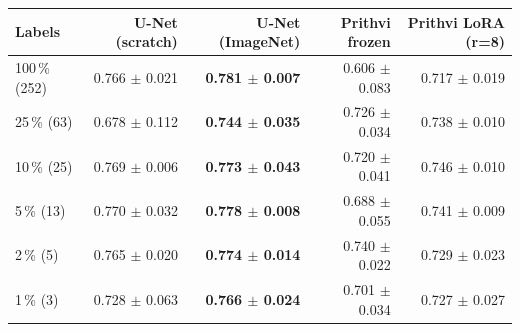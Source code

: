 \begin{tabular}{lrrrr}
\toprule
Labels & U-Net (scratch) & U-Net (ImageNet) & Prithvi frozen & Prithvi LoRA (r=8) \\
\midrule
100\,\% (252) & 0.766 $\pm$ 0.021 & \textbf{0.781 $\pm$ 0.007} & 0.606 $\pm$ 0.083 & 0.717 $\pm$ 0.019 \\
25\,\% (63) & 0.678 $\pm$ 0.112 & \textbf{0.744 $\pm$ 0.035} & 0.726 $\pm$ 0.034 & 0.738 $\pm$ 0.010 \\
10\,\% (25) & 0.769 $\pm$ 0.006 & \textbf{0.773 $\pm$ 0.043} & 0.720 $\pm$ 0.041 & 0.746 $\pm$ 0.010 \\
5\,\% (13) & 0.770 $\pm$ 0.032 & \textbf{0.778 $\pm$ 0.008} & 0.688 $\pm$ 0.055 & 0.741 $\pm$ 0.009 \\
2\,\% (5) & 0.765 $\pm$ 0.020 & \textbf{0.774 $\pm$ 0.014} & 0.740 $\pm$ 0.022 & 0.729 $\pm$ 0.023 \\
1\,\% (3) & 0.728 $\pm$ 0.063 & \textbf{0.766 $\pm$ 0.024} & 0.701 $\pm$ 0.034 & 0.727 $\pm$ 0.027 \\
\bottomrule
\end{tabular}
